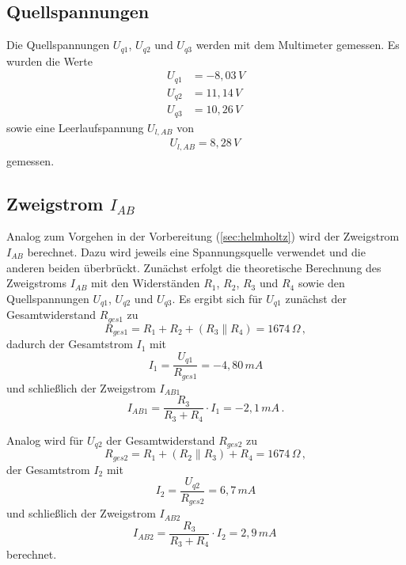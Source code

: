 \subsection{Quellspannungen}
Die Quellspannungen $U_{q1}$, $U_{q2}$ und $U_{q3}$ werden mit dem Multimeter gemessen. Es wurden die Werte
\begin{align*}
    U_{q1} & = -8,03\,V \\
    U_{q2} & = 11,14\,V \\
    U_{q3} & = 10,26\,V
\end{align*}
sowie eine Leerlaufspannung $U_{l,AB}$ von
\begin{align*}
    U_{l,AB}=8,28\,V\,
\end{align*}
gemessen.

\subsection{Zweigstrom $I_{AB}$}
Analog zum Vorgehen in der Vorbereitung (\ref{sec:helmholtz}) wird der Zweigstrom $I_{AB}$ berechnet. Dazu wird jeweils eine Spannungsquelle verwendet und die anderen beiden überbrückt. Zunächst erfolgt die theoretische Berechnung des Zweigstroms $I_{AB}$ mit den Widerständen $R_1$, $R_2$, $R_3$ und $R_4$ sowie den Quellspannungen $U_{q1}$, $U_{q2}$ und $U_{q3}$. Es ergibt sich für $U_{q1}$ zunächst der Gesamtwiderstand $R_{ges1}$ zu
\begin{equation*}
    R_{ges1}=R_1+R_2+(R_3\parallel R_4)=1674\,\Omega\, ,
\end{equation*}
dadurch der Gesamtstrom $I_{1}$ mit
\begin{equation*}
    I_{1}=\frac{U_{q1}}{R_{ges1}}=-4,80\,mA
\end{equation*}
und schließlich der Zweigstrom $I_{AB1}$
\begin{equation}
    \label{eq:zweigstrom1}
    I_{AB1}=\frac{R_3}{R_3+R_4}\cdot I_{1}=-2,1\,mA\, .
\end{equation}

Analog wird für $U_{q2}$ der Gesamtwiderstand $R_{ges2}$ zu
\begin{equation*}
    R_{ges2}=R_1+(R_2\parallel R_3)+R_4=1674\,\Omega\, ,
\end{equation*}
der Gesamtstrom $I_{2}$ mit
\begin{equation*}
    I_{2}=\frac{U_{q2}}{R_{ges2}}=6,7\,mA
\end{equation*}
und schließlich der Zweigstrom $I_{AB2}$
\begin{equation}
    \label{eq:zweigstrom2}
    I_{AB2}=\frac{R_3}{R_3+R_4}\cdot I_{2}=2,9\,mA\,
\end{equation}
berechnet.

